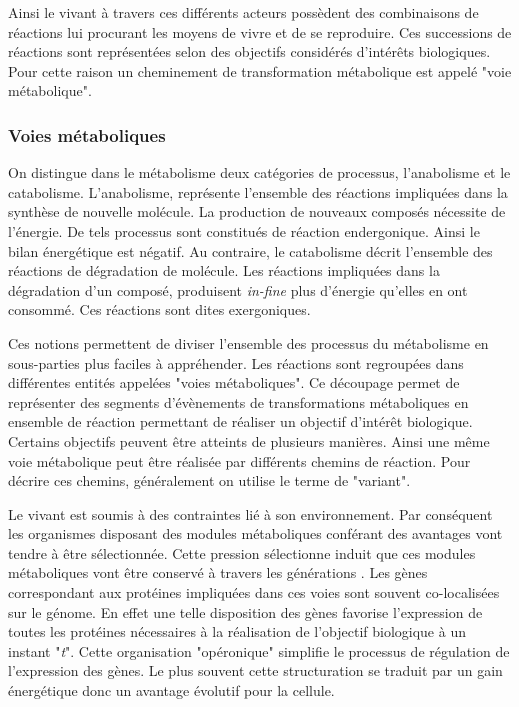 \begin{refsegment}
    Ainsi le vivant à travers ces différents acteurs possèdent des combinaisons de réactions lui procurant les moyens de vivre et de se reproduire. Ces successions de réactions sont représentées selon des objectifs considérés d'intérêts biologiques. Pour cette raison un cheminement de transformation métabolique est appelé "voie métabolique".
    
    
    \subsubsection{Voies métaboliques}
    On distingue dans le métabolisme deux catégories de processus, l'anabolisme et le catabolisme. L'anabolisme, représente l'ensemble des réactions impliquées dans la synthèse de nouvelle molécule. La production de nouveaux composés nécessite de l'énergie. De tels processus sont constitués de réaction endergonique. Ainsi le bilan énergétique est négatif.  Au contraire, le catabolisme décrit l'ensemble des réactions de dégradation de molécule. Les réactions impliquées dans la dégradation d'un composé, produisent \textit{in-fine} plus d'énergie qu'elles en ont consommé. Ces réactions sont dites exergoniques.
    
    Ces notions permettent de diviser l'ensemble des processus du métabolisme en sous-parties plus faciles à appréhender. Les réactions sont regroupées dans différentes entités appelées "voies métaboliques". Ce découpage permet de représenter des segments d'évènements de transformations métaboliques en ensemble de réaction permettant de réaliser un objectif d'intérêt biologique. Certains objectifs peuvent être atteints de plusieurs manières. Ainsi une même voie métabolique peut être réalisée par différents chemins de réaction. Pour décrire ces chemins, généralement on utilise le terme de "variant".
    
    Le vivant est soumis à des contraintes lié à son environnement. Par conséquent les organismes disposant des modules métaboliques conférant des avantages vont tendre à être sélectionnée. Cette pression sélectionne induit que ces modules métaboliques vont être conservé à travers les générations \cite{braakman2012compositional}. Les gènes correspondant aux protéines impliquées dans ces voies sont souvent co-localisées sur le génome. En effet une telle disposition des gènes favorise l'expression de toutes les protéines nécessaires à la réalisation de l'objectif biologique à un instant "\textit{t}". Cette organisation "opéronique" simplifie le processus de régulation de l'expression des gènes. Le plus souvent cette structuration se traduit par un gain énergétique donc un avantage évolutif pour la cellule.
    

\end{refsegment}
